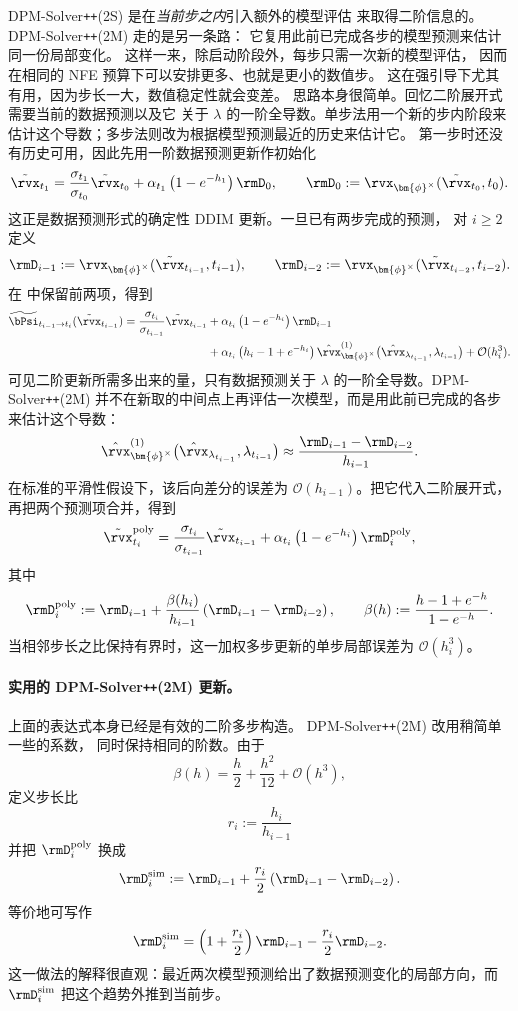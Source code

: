 DPM-Solver\texttt{++}(2S) 是在\emph{当前步之内}引入额外的模型评估
来取得二阶信息的。DPM-Solver\texttt{++}(2M) 走的是另一条路：
它复用此前已完成各步的模型预测来估计同一份局部变化。
这样一来，除启动阶段外，每步只需一次新的模型评估，
因而在相同的 NFE 预算下可以安排更多、也就是更小的数值步。
这在强引导下尤其有用，因为步长一大，数值稳定性就会变差。
思路本身很简单。回忆二阶展开式
 需要当前的数据预测以及它
关于 $\lambda$ 的一阶全导数。单步法用一个新的步内阶段来估计这个导数；多步法则改为根据模型预测最近的历史来估计它。
第一步时还没有历史可用，因此先用一阶数据预测更新作初始化
\[
\tilde\rvx_{t_1}
=
\frac{\sigma_{t_1}}{\sigma_{t_0}}
\tilde\rvx_{t_0}
+
\alpha_{t_1}
\left(
1-e^{-h_1}
\right)
\rmD_0,
\qquad
\rmD_0
:=
\rvx_{\bm{\phi}^\times}
(\tilde\rvx_{t_0},t_0).
\]
这正是数据预测形式的确定性 DDIM 更新。一旦已有两步完成的预测，
对 $i\geq2$ 定义
\[
\rmD_{i-1}
:=
\rvx_{\bm{\phi}^\times}
(\tilde\rvx_{t_{i-1}},t_{i-1}),
\qquad
\rmD_{i-2}
:=
\rvx_{\bm{\phi}^\times}
(\tilde\rvx_{t_{i-2}},t_{i-2}).
\]
在  中保留前两项，得到
\begin{align*}
\widetilde\bPsi_{t_{i-1}\to t_i}
(\tilde\rvx_{t_{i-1}})
=
\frac{\sigma_{t_i}}{\sigma_{t_{i-1}}}
\tilde\rvx_{t_{i-1}}
&+
\alpha_{t_i}
\left(
1-e^{-h_i}
\right)
\rmD_{i-1}
\\
&+
\alpha_{t_i}
\left(
h_i-1+e^{-h_i}
\right)
\hat{\rvx}_{\bm{\phi}^\times}^{(1)}
\bigl(
\hat\rvx_{\lambda_{t_{i-1}}},
\lambda_{t_{i-1}}
\bigr)
+
\mathcal O(h_i^3).
\end{align*}
可见二阶更新所需多出来的量，只有数据预测关于 $\lambda$
的一阶全导数。DPM-Solver\texttt{++}(2M) 并不在新取的中间点上再评估一次模型，而是用此前已完成的各步来估计这个导数：
\[
\hat{\rvx}_{\bm{\phi}^\times}^{(1)}
\bigl(
\hat\rvx_{\lambda_{t_{i-1}}},
\lambda_{t_{i-1}}
\bigr)
\approx
\frac{
\rmD_{i-1}-\rmD_{i-2}
}{
h_{i-1}
}.
\]
在标准的平滑性假设下，该后向差分的误差为
$\mathcal O(h_{i-1})$。把它代入二阶展开式，
再把两个预测项合并，得到
\[
\tilde\rvx_{t_i}^{\mathrm{poly}}
=
\frac{\sigma_{t_i}}{\sigma_{t_{i-1}}}
\tilde\rvx_{t_{i-1}}
+
\alpha_{t_i}
\left(
1-e^{-h_i}
\right)
\rmD_i^{\mathrm{poly}},
\]
其中
\[
\rmD_i^{\mathrm{poly}}
:=
\rmD_{i-1}
+
\frac{\beta(h_i)}{h_{i-1}}
\left(
\rmD_{i-1}-\rmD_{i-2}
\right),
\qquad
\beta(h)
:=
\frac{
h-1+e^{-h}
}{
1-e^{-h}
}.
\]
当相邻步长之比保持有界时，这一加权多步更新的单步局部误差为 $\mathcal O(h_i^3)$。

\paragraph{实用的 DPM-Solver\texttt{++}(2M) 更新。}
上面的表达式本身已经是有效的二阶多步构造。
DPM-Solver\texttt{++}(2M) 改用稍简单一些的系数，
同时保持相同的阶数。由于
\[
\beta(h)
=
\frac{h}{2}
+
\frac{h^2}{12}
+
\mathcal O(h^3),
\]
定义步长比
\[
r_i
:=
\frac{h_i}{h_{i-1}}
\]
并把 $\rmD_i^{\mathrm{poly}}$ 换成
\[
\rmD_i^{\mathrm{sim}}
:=
\rmD_{i-1}
+
\frac{r_i}{2}
\left(
\rmD_{i-1}-\rmD_{i-2}
\right).
\]
等价地可写作
\[
\rmD_i^{\mathrm{sim}}
=
\left(
1+\frac{r_i}{2}
\right)\rmD_{i-1}
-
\frac{r_i}{2}\rmD_{i-2}.
\]
这一做法的解释很直观：最近两次模型预测给出了数据预测变化的局部方向，而 $\rmD_i^{\mathrm{sim}}$
把这个趋势外推到当前步。

